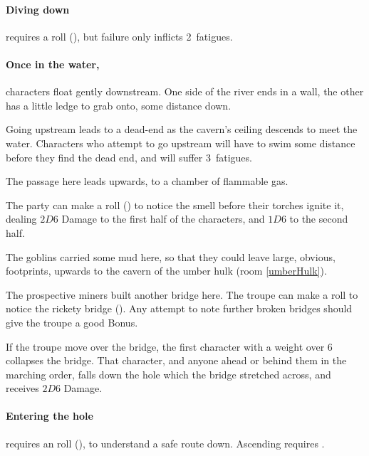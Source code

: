 \begin{multicols}{2}
\paragraph{Diving down}
requires a  roll (\tn[10]), but failure only inflicts 2~\glspl{fatigue}.

\paragraph{Once in the water,}
characters float gently downstream.
One side of the river ends in a wall, the other has a little ledge to grab onto, some distance down.

Going upstream leads to a dead-end as the cavern's ceiling descends to meet the water.
Characters who attempt to go upstream will have to swim some distance before they find the dead end, and will suffer 3~\glspl{fatigue}.


The passage here leads upwards, to a chamber of flammable gas.

The party can make a  roll (\tn[13]) to notice the smell before their torches ignite it, dealing $2D6$ Damage to the first half of the characters, and $1D6$ to the second half.


The goblins carried some mud here, so that they could leave large, obvious, footprints, upwards to the cavern of the umber hulk (room \ref{umberHulk}).


The prospective miners built another bridge here.
The troupe can make a  roll to notice the rickety bridge (\tn[10]).
Any attempt to note further broken bridges should give the troupe a good Bonus.

If the troupe move over the bridge, the first character with a \gls{weight} over 6 collapses the bridge.
That character, and anyone ahead or behind them in the marching order, falls down the hole which the bridge stretched across, and receives $2D6$ Damage.

\paragraph{Entering the hole}
requires an  roll (\tn[10]), to understand a safe route down.
Ascending requires \tn[12].


\end{multicols}
